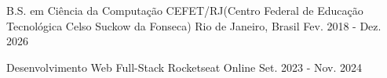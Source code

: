 

\begin{cventries}

  \cventry
    {B.S. em Ciência da Computação} %
    {CEFET/RJ(Centro Federal de Educação Tecnológica Celso Suckow da Fonseca)} %
    {Rio de Janeiro, Brasil} %
    {Fev. 2018 - Dez. 2026} %
    {}

  \cventry
    {Desenvolvimento Web Full-Stack} %
    {Rocketseat} %
    {Online} %
    {Set. 2023 - Nov. 2024} %
    {}

\end{cventries}
